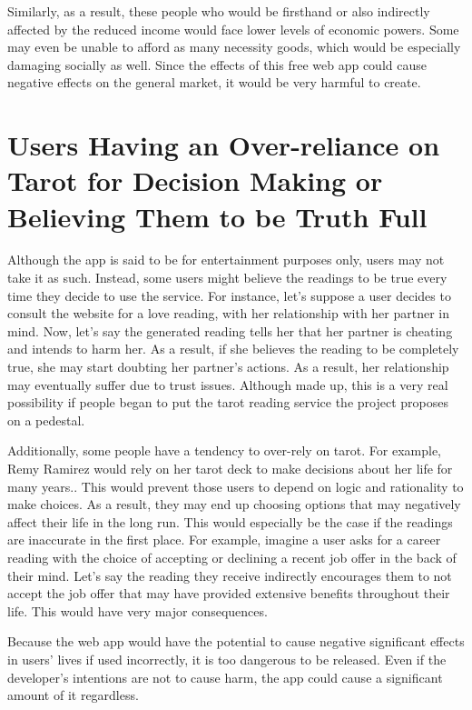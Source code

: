 \documentclass[10pt,twocolumn]{article}
\begin{document}
    Similarly, as a result, these people who would be firsthand or also indirectly affected by the reduced income would face lower levels of economic powers. Some may even be unable to afford as many necessity goods, which would be especially damaging socially as well. Since the effects of this free web app could cause negative effects on the general market, it would be very harmful to create.

\section{Users Having an Over-reliance on Tarot for Decision Making or Believing Them to be Truth Full}
    Although the app is said to be for entertainment purposes only, users may not take it as such. Instead, some users might believe the readings to be true every time they decide to use the service. For instance, let's suppose a user decides to consult the website for a love reading, with her relationship with her partner in mind. Now, let's say the generated reading tells her that her partner is cheating and intends to harm her. As a result, if she believes the reading to be completely true, she may start doubting her partner's actions. As a result, her relationship may eventually suffer due to trust issues. Although made up, this is a very real possibility if people began to put the tarot reading service the project proposes on a pedestal. 
    
    Additionally, some people have a tendency to over-rely on tarot. For example, Remy Ramirez would rely on her tarot deck to make decisions about her life for many years.\cite{ramirez_2021}. This would prevent those users to depend on logic and rationality to make choices. As a result, they may end up choosing options that may negatively affect their life in the long run. This would especially be the case if the readings are inaccurate in the first place. For example, imagine a user asks for a career reading with the choice of accepting or declining a recent job offer in the back of their mind. Let's say the reading they receive indirectly encourages them to not accept the job offer that may have provided extensive benefits throughout their life. This would have very major consequences.
    
    Because the web app would have the potential to cause negative significant effects in users' lives if used incorrectly, it is too dangerous to be released. Even if the developer's intentions are not to cause harm, the app could cause a significant amount of it regardless.
\end{document}
